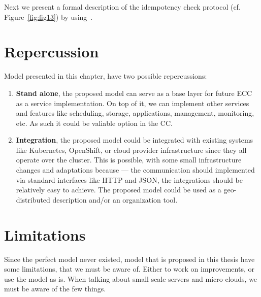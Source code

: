 Next we present a formal description of the idempotency check protocol (cf. Figure~\ref{fig:fig13}) by using~\cite{HuY17}.
%
%
\section{Repercussion}\label{sec:repercussion}
%
Model presented in this chapter, have two possible repercussions:

\begin{enumerate}[start=1,label={(\bfseries \arabic*)}]
	\item \textbf{Stand alone}, the proposed model can serve as a base layer for future ECC as a service implementation. On top of it, we can implement other services and features like scheduling, storage, applications, management, monitoring, etc. As such it could be valiable option in the CC.
	\item \textbf{Integration}, the proposed model could be integrated with existing systems like Kubernetes, OpenShift, or cloud provider infrastructure since they all operate over the cluster. This is possible, with some small infrastructure changes and adaptations because --- the communication should implemented via standard interfaces like HTTP and JSON, the integrations should be relatively easy to achieve. The proposed model could be used as a geo-distributed description and/or an  organization tool.
\end{enumerate} 
%
%
\section{Limitations}\label{sec:limitations}
%
Since the perfect model never existed, model that is proposed in this thesis have some limitations, that we must be aware of. Either to work on improvements, or use the model as is. When talking about small scale servers and micro-clouds, we must be aware of the few things. 

